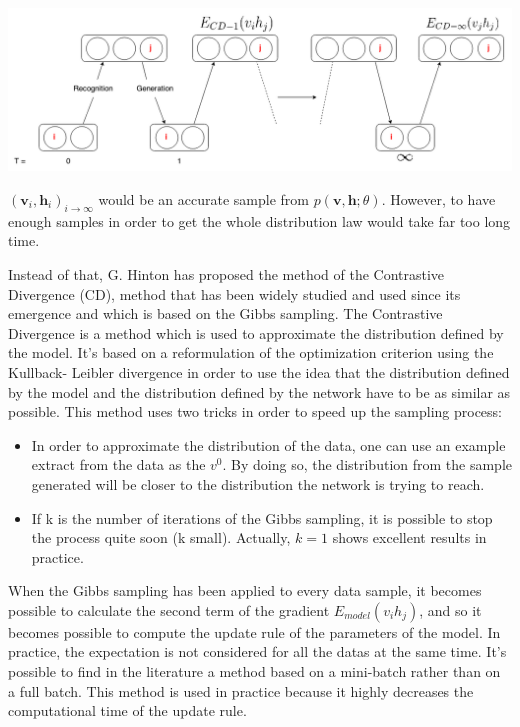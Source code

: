 \documentclass{report}
\begin{document}
	\vspace{0.5cm}
	\begin{center}
		\includegraphics[scale=0.5]{ressources/GibbsSampling}
	\end{center}
	\vspace{0.5cm}

	
	$(\textbf{v}_i,\textbf{h}_i)_{i \rightarrow \infty}$ would be an accurate sample 
	from $p(\textbf{v}, \textbf{h}; \theta)$. However, to have enough samples in order 
	to get the whole distribution law would take far too long time.
	
	Instead of that, G. Hinton \cite{hinton2006fast} has proposed 
	the method of the Contrastive Divergence (CD), method that has been widely 
	studied and used since its emergence \cite{bengio2009justifying} and 
	which is based on the Gibbs sampling. The Contrastive Divergence is a method 
	which is used to approximate the distribution defined by the model. It's based 
	on a reformulation of the optimization criterion using the Kullback- Leibler 
	divergence in order to use the idea that the distribution defined by the model 
	and the distribution defined by the network have to be as similar as possible. 
	This method uses two tricks in order to speed up the sampling process:
	
	\begin{itemize} 
	
		\item In order to approximate the distribution of the data, one can use an 
	example extract from the data as the $v^0$. By doing so, the distribution from 
	the sample generated will be closer to the distribution the network is trying 
	to reach. 
	
		\item If k is the number of iterations of the Gibbs sampling, it is possible to 
	stop the process quite soon (k small). Actually, $k=1$ shows excellent results 
	in practice. 
	
	\end{itemize}
	When the Gibbs sampling has been applied to every data sample, it becomes 
	possible to calculate the second term of the gradient $E_{model}(v_i h_j)$, and 
	so it becomes possible to compute the update rule of the parameters of the 
	model. In practice, the expectation is not considered for all the datas at the 
	same time. It's possible to find in the literature 
	\cite{hinton2010practical} a method based on a mini-batch rather than on 
	a full batch. This method is used in practice because it highly decreases the 
	computational time of the update rule.
	
\end{document}
